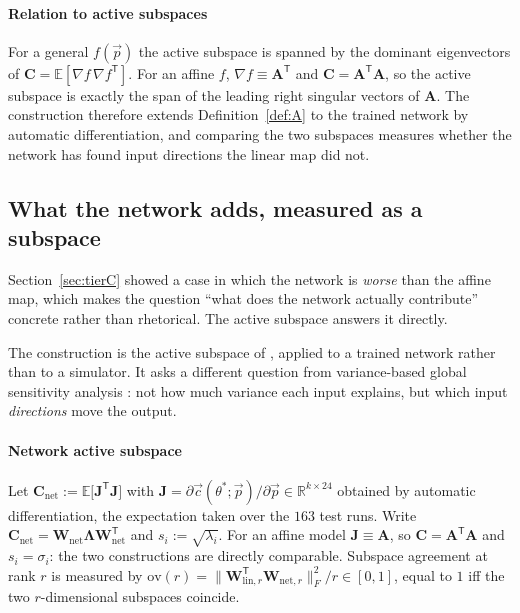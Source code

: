 \documentclass[11pt,a4paper]{article}
\newcommand{\vect}[1]{\mathbf{#1}}
\newcommand{\Real}{\mathbb{R}}
\newcommand{\Exp}{\mathbb{E}}
\theoremstyle{plain}
\theoremstyle{definition}
\theoremstyle{remark}
\begin{document}
\paragraph{Relation to active subspaces}
For a general $f(\vec{p})$ the active subspace is spanned by the dominant
eigenvectors of $\vect{C} = \Exp[\nabla f\,\nabla f^{\mathsf{T}}]$. For an
affine $f$, $\nabla f \equiv \vect{A}^{\mathsf{T}}$ and
$\vect{C} = \vect{A}^{\mathsf{T}}\vect{A}$, so the active subspace is exactly
the span of the leading right singular vectors of $\vect{A}$. The construction
therefore extends Definition~\ref{def:A} to the trained network by automatic
differentiation, and comparing the two subspaces measures whether the network
has found input directions the linear map did not.

\subsection{What the network adds, measured as a subspace}
\label{sec:active}

Section~\ref{sec:tierC} showed a case in which the network is
\emph{worse} than the affine map, which makes the question ``what does the
network actually contribute'' concrete rather than rhetorical. The active
subspace answers it directly.

The construction is the active subspace of
\cite{constantine-book,constantine-paper}, applied to a trained network rather
than to a simulator. It asks a different question from variance-based global
sensitivity analysis \cite{saltelli}: not how much variance each input explains,
but which input \emph{directions} move the output.

\label{def:active}
\paragraph{Network active subspace}
Let $\vect{C}_{\mathrm{net}} := \Exp\bigl[\vect{J}^{\mathsf{T}}\vect{J}\bigr]$
with $\vect{J} = \partial\vec{c}(\theta^*;\vec{p})/\partial\vec{p} \in
\Real^{k\times24}$ obtained by automatic differentiation, the expectation taken
over the $163$ test runs. Write $\vect{C}_{\mathrm{net}} = \vect{W}_{\mathrm{net}}
\vect{\Lambda}\vect{W}_{\mathrm{net}}^{\mathsf{T}}$ and
$s_i := \sqrt{\lambda_i}$. For an affine model $\vect{J} \equiv
\vect{A}$, so $\vect{C} = \vect{A}^{\mathsf{T}}\vect{A}$ and $s_i = \sigma_i$:
the two constructions are directly comparable. Subspace agreement at rank $r$ is
measured by
$\mathrm{ov}(r) = \|\vect{W}_{\mathrm{lin},r}^{\mathsf{T}}\vect{W}_{\mathrm{net},r}\|_F^2/r
\in[0,1]$, equal to $1$ iff the two $r$-dimensional subspaces coincide.
\end{document}
